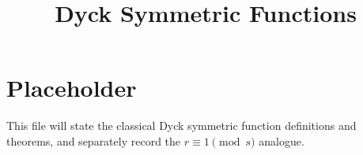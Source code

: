 \documentclass{article}
\title{Dyck Symmetric Functions}
\author{}
\date{}
\begin{document}
\maketitle

\section{Placeholder}

This file will state the classical Dyck symmetric function definitions and
theorems, and separately record the \(r\equiv 1 \pmod s\) analogue.
\end{document}
